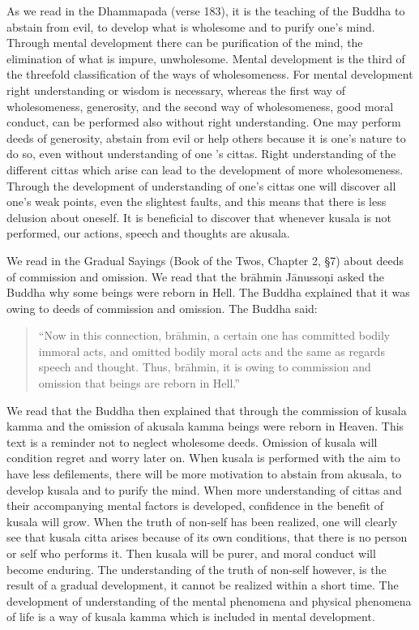 \documentclass{book}
\begin{document}
As we read in the Dhammapada (verse 183), it is the teaching of the
Buddha to abstain from evil, to develop what is wholesome and to purify
one's mind. Through mental development there can be purification of the
mind, the elimination of what is impure, unwholesome. Mental development
is the third of the threefold classification of the ways of
wholesomeness. For mental development right understanding or wisdom is
necessary, whereas the first way of wholesomeness, generosity, and the
second way of wholesomeness, good moral conduct, can be performed also
without right understanding. One may perform deeds of generosity,
abstain from evil or help others because it is one's nature to do so,
even without understanding of one 's cittas. Right under­standing of     the different cittas which arise can lead to the development of more wholesomeness. Through the development of understanding of one's cittas  one will discover all one's weak points, even the slightest faults, and this means that there is less delusion about oneself. It is beneficial 
to discover that whenever kusala is not performed, our actions, speech and thoughts are akusala.

We read in the Gradual Sayings (Book of the Twos, Chapter 2, §7) about
deeds of commission and omission. We read that the brāhmin Jānussoṇi
asked the Buddha why some beings were reborn in Hell. The Buddha
explained that it was owing to deeds of commission and omission. The
Buddha said:

\begin{quote}
``Now in this connection, brāhmin, a certain one has committed bodily
immoral acts, and omitted bodily moral acts and the same as regards
speech and thought. Thus, brāhmin, it is owing to commission and
omission that beings are reborn in Hell.''
\end{quote}

We read that the Buddha then explained that through the commission of
kusala kamma and the omission of akusala kamma beings were reborn in
Heaven. This text is a reminder not to neglect wholesome deeds. Omission  of kusala will condition regret and worry later on. When kusala is performed with the aim to have less defilements, there will be more motivation to abstain from akusala, to develop kusala and to purify the mind. When more understanding of cittas and their accompanying mental factors is developed, confidence in the benefit of kusala will grow.    When the truth of non-self has been realized, one will clearly see that kusala citta arises because of its own conditions, that there is no   person or self who performs it. Then kusala will be purer, and moral conduct will become enduring. The under­standing of the truth of       non-self however, is the result of a gradual development, it cannot be realized within a short time. The development of understanding of the mental phenomena and physical phenomena of life is a way of kusala 
kamma which is included in mental development.
\end{document}

